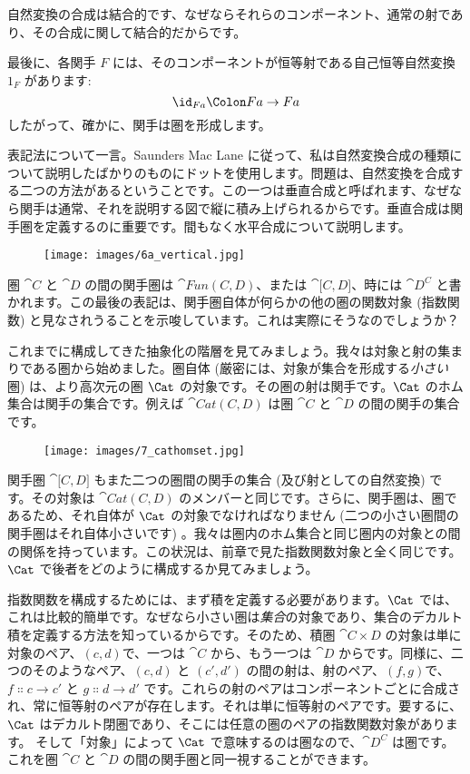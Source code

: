\noindent
自然変換の合成は結合的です、なぜならそれらのコンポーネント、通常の射であり、その合成に関して結合的だからです。

最後に、各関手 $F$ には、そのコンポーネントが恒等射である自己恒等自然変換 $1_F$ があります: 
\[\id_{F a} \Colon F a \to F a\]
したがって、確かに、関手は圏を形成します。

表記法について一言。Saunders Mac Lane に従って、私は自然変換合成の種類について説明したばかりのものにドットを使用します。問題は、自然変換を合成する二つの方法があるということです。この一つは垂直合成と呼ばれます、なぜなら関手は通常、それを説明する図で縦に積み上げられるからです。垂直合成は関手圏を定義するのに重要です。間もなく水平合成について説明します。

\begin{figure}[H]
  \centering
  \texttt{[image: images/6a\_vertical.jpg]}
\end{figure}

\noindent
圏 $\cat{C}$ と $\cat{D}$ の間の関手圏は $\cat{Fun(C, D)}$、または $\cat{{[}C, D{]}}$、時には $\cat{D^C}$ と書かれます。この最後の表記は、関手圏自体が何らかの他の圏の関数対象 (指数関数) と見なされうることを示唆しています。これは実際にそうなのでしょうか？

これまでに構成してきた抽象化の階層を見てみましょう。我々は対象と射の集まりである圏から始めました。圏自体 (厳密には、対象が集合を形成する\emph{小さい}圏) は、より高次元の圏 $\Cat$ の対象です。その圏の射は関手です。$\Cat$ のホム集合は関手の集合です。例えば $\cat{Cat(C, D)}$ は圏 $\cat{C}$ と $\cat{D}$ の間の関手の集合です。

\begin{figure}[H]
  \centering
  \texttt{[image: images/7\_cathomset.jpg]}
\end{figure}

\noindent
関手圏 $\cat{{[}C, D{]}}$ もまた二つの圏間の関手の集合 (及び射としての自然変換) です。その対象は $\cat{Cat(C, D)}$ のメンバーと同じです。さらに、関手圏は、圏であるため、それ自体が $\Cat$ の対象でなければなりません (二つの小さい圏間の関手圏はそれ自体小さいです) 。我々は圏内のホム集合と同じ圏内の対象との間の関係を持っています。この状況は、前章で見た指数関数対象と全く同じです。$\Cat$ で後者をどのように構成するか見てみましょう。

指数関数を構成するためには、まず積を定義する必要があります。$\Cat$ では、これは比較的簡単です。なぜなら小さい圏は\emph{集合}の対象であり、集合のデカルト積を定義する方法を知っているからです。そのため、積圏 $\cat{C\times D}$ の対象は単に対象のペア、$(c, d)$で、一つは $\cat{C}$ から、もう一つは $\cat{D}$ からです。同様に、二つのそのようなペア、$(c, d)$ と $(c', d')$ の間の射は、射のペア、$(f, g)$で、$f \Colon c \to c'$ と $g \Colon d \to d'$ です。これらの射のペアはコンポーネントごとに合成され、常に恒等射のペアが存在します。それは単に恒等射のペアです。要するに、$\Cat$ はデカルト閉圏であり、そこには任意の圏のペアの指数関数対象があります。
そして「対象」によって $\Cat$ で意味するのは圏なので、$\cat{D^C}$ は圏です。これを圏 $\cat{C}$ と $\cat{D}$ の間の関手圏と同一視することができます。

